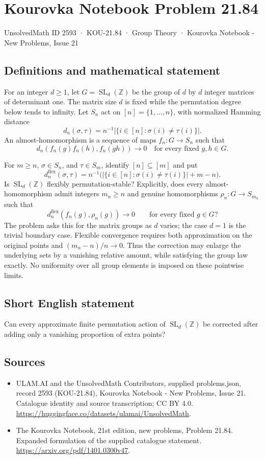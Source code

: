 \documentclass[11pt,a4paper]{article}
\begin{document}
\section*{Kourovka Notebook Problem 21.84}\label{2593}
{\small UnsolvedMath ID 2593 · KOU-21.84 · Group Theory · Kourovka Notebook - New Problems, Issue 21}
\subsection{Definitions and mathematical statement}
For an integer $d\ge1$, let $G=\operatorname{SL}_d(\mathbb Z)$ be the group of $d$ by $d$ integer matrices of determinant one. The matrix size $d$ is fixed while the permutation degree below tends to infinity. Let $S_n$ act on $[n]=\{1,\ldots,n\}$, with normalized Hamming distance
\[
 d_n(\sigma,\tau)=n^{-1}|\{i\in[n]:\sigma(i)\ne\tau(i)\}|.
\]
An almost-homomorphism is a sequence of maps $f_n:G\to S_n$ such that
\[
 d_n(f_n(g)f_n(h),f_n(gh))\longrightarrow0
 \quad\text{for every fixed }g,h\in G.
\]

For $m\ge n$, $\sigma\in S_n$, and $\tau\in S_m$, identify $[n]\subseteq[m]$ and put
\[
 d_n^{\mathrm{flex}}(\sigma,\tau)
 =n^{-1}\bigl(|\{i\in[n]:\sigma(i)\ne\tau(i)\}|+m-n\bigr).
\]
Is $\operatorname{SL}_d(\mathbb Z)$ flexibly permutation-stable? Explicitly, does every almost-homomorphism admit integers $m_n\ge n$ and genuine homomorphisms $\rho_n:G\to S_{m_n}$ such that
\[
 d_n^{\mathrm{flex}}(f_n(g),\rho_n(g))\longrightarrow0
 \qquad\text{for every fixed }g\in G?
\]
The problem asks this for the matrix groups as $d$ varies; the case $d=1$ is the trivial boundary case. Flexible convergence requires both approximation on the original points and $(m_n-n)/n\to0$. Thus the correction may enlarge the underlying sets by a vanishing relative amount, while satisfying the group law exactly. No uniformity over all group elements is imposed on these pointwise limits.
\subsection{Short English statement}
Can every approximate finite permutation action of $\operatorname{SL}_d(\mathbb Z)$ be corrected after adding only a vanishing proportion of extra points?
\subsection{Sources}
\begin{itemize}
\item[S1] ULAM.AI and the UnsolvedMath Contributors, supplied problems.json, record 2593 (KOU-21.84), Kourovka Notebook - New Problems, Issue 21. Catalogue identity and source transcription; CC BY 4.0.
\url{https://huggingface.co/datasets/ulamai/UnsolvedMath}.
\item[S2] The Kourovka Notebook, 21st edition, new problems, Problem 21.84. Expanded formulation of the supplied catalogue statement.
\url{https://arxiv.org/pdf/1401.0300v47}.
\end{itemize}
\end{document}
